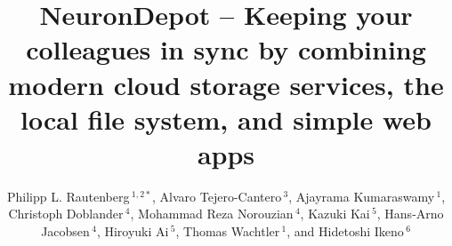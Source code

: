 \documentclass{frontiersSCNS} %
\def\firstAuthorLast{Rautenberg {et~al.}} %
\def\Authors{
Philipp L. Rautenberg\,$^{1,2*}$,
Alvaro Tejero-Cantero\,$^{3}$,
Ajayrama Kumaraswamy\,$^{1}$,
Christoph Doblander\,$^{4}$,
Mohammad Reza Norouzian\,$^{4}$,
Kazuki Kai\,$^{5}$,
Hans-Arno Jacobsen\,$^{4}$,
Hiroyuki Ai\,$^{5}$,
Thomas Wachtler\,$^{1}$,
and Hidetoshi Ikeno\,$^6$}
\begin{document}
\onecolumn
{}

\title[NeuronDepot – Keeping your colleagues in sync]{NeuronDepot – Keeping
your colleagues in sync by combining modern cloud storage services, the local
file system, and simple web apps}
\author[\firstAuthorLast ]{\Authors}
\address{}
\correspondance{}
\extraAuth{}%

\maketitle

\end{document}
